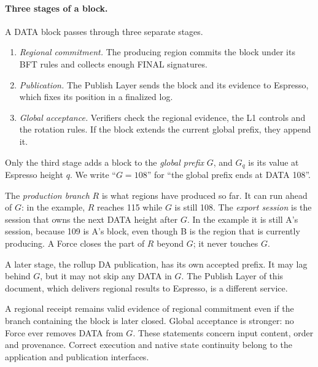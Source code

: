 \documentclass[11pt,a4paper]{article}
\newcommand{\defterm}[1]{\textcolor{rrBlue}{\textit{#1}}}
\begin{document}
\paragraph{Three stages of a block.}
A DATA block passes through three separate stages.
\begin{enumerate}
\item \emph{Regional commitment.} The producing region commits the block
under its BFT rules and collects enough FINAL signatures.
\item \emph{Publication.} The Publish Layer sends the block and its
evidence to Espresso, which fixes its position in a finalized log.
\item \emph{Global acceptance.} Verifiers check the regional evidence,
the L1 controls and the rotation rules. If the block extends the
current global prefix, they append it.
\end{enumerate}
Only the third stage adds a block to the \defterm{global prefix} $G$,
and $G_q$ is its value at Espresso height $q$. We write ``$G=108$'' for ``the global prefix ends at
DATA 108''.

The \defterm{production branch} $R$ is what regions have produced so
far. It can run ahead of $G$: in the example, $R$ reaches 115 while
$G$ is still 108. The \defterm{export session} is the session that owns
the next DATA height after $G$. In the example it is still A's
session, because 109 is A's block, even though B is the region that is
currently producing. A Force closes the part of $R$ beyond $G$; it
never touches $G$.

A later stage, the rollup DA publication, has its own accepted prefix.
It may lag behind $G$, but it may not skip any DATA
in $G$. The Publish Layer of this document, which delivers regional
results to Espresso, is a different service.

A regional receipt remains valid evidence of regional commitment even
if the branch containing the block is later closed. Global acceptance is
stronger: no Force ever removes DATA from $G$. These statements concern
input content, order and provenance. Correct execution and native state
continuity belong to the application and publication interfaces.
\end{document}
